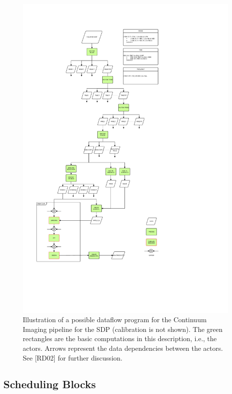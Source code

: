 \documentclass[11pt,a4paper]{article}
\begin{document}
\begin{figure}
  \includegraphics[width=\textwidth,trim=0 4cm 0 0]{figs/dataflow/ContinuumImagingPipeline-Overview}
  \caption{Illustration of a possible dataflow program for the
    Continuum Imaging pipeline for the SDP (calibration is not
    shown). The green rectangles are the basic computations in this
    description, i.e., the actors. Arrows represent the data
    dependencies between the actors.  See [RD02] for further
    discussion.}
  \label{fig:contdataflow}
\end{figure}



\subsection{Scheduling Blocks}
\end{document}
